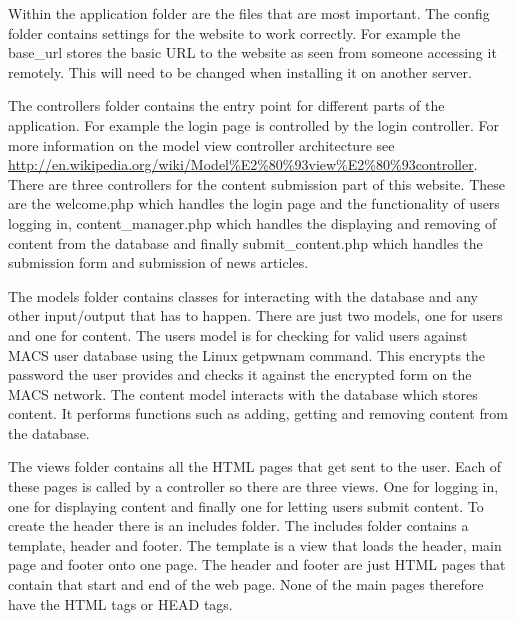 Within the application folder are the files that are most important. The config folder contains settings for the website to work correctly. For example the base\_url stores the basic URL to the website as seen from someone accessing it remotely. This will need to be changed when installing it on another server.

The controllers folder contains the entry point for different parts of the application. For example the login page is controlled by the login controller. For more information on the model view controller architecture see \url{http://en.wikipedia.org/wiki/Model\%E2\%80\%93view\%E2\%80\%93controller}. There are three controllers for the content submission part of this website. These are the welcome.php which handles the login page and the functionality of users logging in, content\_manager.php which handles the displaying and removing of content from the database and finally submit\_content.php which handles the submission form and submission of news articles.

The models folder contains classes for interacting with the database and any other input/output that has to happen. There are just two models, one for users and one for content. The users model is for checking for valid users against MACS user database using the Linux getpwnam command. This encrypts the password the user provides and checks it against the encrypted form on the MACS network. The content model interacts with the database which stores content. It performs functions such as adding, getting and removing content from the database.

The views folder contains all the HTML pages that get sent to the user. Each of these pages is called by a controller so there are three views. One for logging in, one for displaying content and finally one for letting users submit content. To create the header there is an includes folder. The includes folder contains a template, header and footer. The template is a view that loads the header, main page and footer onto one page. The header and footer are just HTML pages that contain that start and end of the web page. None of the main pages therefore have the HTML tags or HEAD tags. 
